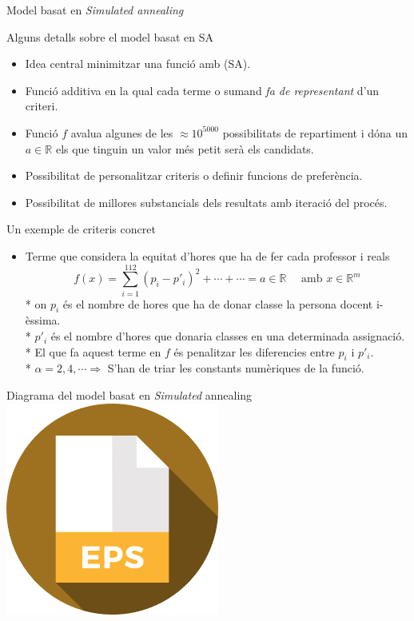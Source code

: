 \documentclass[twocolumn]{beamer}
\newcommand{\R}{\ensuremath{\mathbb{R}}}
\begin{document}
\begin{frame}{Model basat en \textit{Simulated annealing}}
\begin{box1}{\normalsize Alguns detalls sobre el model basat en SA}
	\begin{itemize}
		\item Idea central minimitzar una funció amb (SA).
		\item Funció additiva en la qual cada terme o sumand \textit{fa de representant} d'un criteri. 
		\item Funció $f$ avalua algunes de les $ \approx 10^{5000}$ possibilitats de repartiment i dóna un $a \in \R$ els que tinguin un valor més petit serà els candidats.
		\item Possibilitat de personalitzar criteris o definir funcions de preferència.
		\item Possibilitat de millores substancials dels resultats amb iteració del procés.
	\end{itemize}
\end{box1}
\end{frame}
\begin{frame}
\begin{box1}{\normalsize Un exemple de criteris concret}
	\begin{itemize}
		\item Terme que considera la equitat d'hores que ha de fer cada professor i reals  
		 $$f(x)=\sum_{i=1}^{112}(p_i-p'_i)^2+ \cdots + \cdots =a \in \R \quad \text{ amb } x \in \R^m$$
		 * on $p_i$ és el nombre de hores que ha de donar classe la persona docent i-èssima.
		 \\
		 * $p'_i$ és el nombre d'hores que donaria classes en una determinada assignació.
		 \\
		 * El que fa aquest terme en $f$ és penalitzar les diferencies entre $p_i$ i $p'_i$.
		 \\
		 * $\alpha=2,4,\cdots \Rightarrow$ S'han de triar les constants numèriques de la funció.
	\end{itemize}
\end{box1}
\end{frame}
\begin{frame}{Diagrama del model basat en \textit{Simulated} annealing}
\centering
\includegraphics[width=7cm]{eps}
\end{frame}
\end{document}
